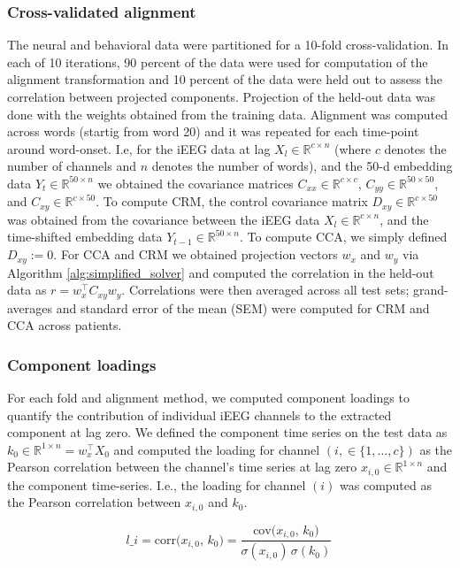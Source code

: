 \documentclass{article}
\begin{document}
\subsubsection*{Cross-validated alignment}
The neural and behavioral data were partitioned for a 10-fold cross-validation. In each of 10 iterations, 90 percent of the data were used for computation of the alignment transformation and 10 percent of the data were held out to assess the correlation between projected components. Projection of the held-out data was done with the weights obtained from the training data. Alignment was computed across words (startig from word 20) and it was repeated for each time-point around word-onset. I.e, for the iEEG data at lag $X_{l} \in \mathbb{R}^{c \times n}$ (where $c$ denotes the number of channels and $n$ denotes the number of words), and the 50-d embedding data $Y_t \in \mathbb{R}^{50 \times n}$ we obtained the covariance matrices $C_{xx} \in \mathbb{R}^{c \times c}$, $C_{yy} \in \mathbb{R}^{50 \times 50}$, and $C_{xy} \in \mathbb{R}^{c \times 50}$. To compute CRM, the control covariance matrix $D_{xy} \in \mathbb{R}^{c \times 50}$ was obtained from the covariance between the iEEG data $X_{l} \in \mathbb{R}^{c \times n}$, and the time-shifted embedding data  $Y_{t-1} \in \mathbb{R}^{50 \times n}$. To compute CCA, we simply defined $D_{xy} := 0 $. For CCA and CRM we obtained projection vectors $w_x$ and $w_y$ via Algorithm \ref{alg:simplified_solver} and computed the correlation in the held-out data as $r = w_x^\top C_{xy} w_y$. Correlations were then averaged across all test sets; grand-averages and standard error of the mean (SEM) were computed for CRM and CCA across patients.
\subsubsection*{Component loadings}
For each fold and alignment method, we computed component loadings to quantify the contribution of individual iEEG channels to the extracted component at lag zero. We defined the component time series on the test data as $k_{0} \in \mathbb{R}^{1 \times n} = w_x^\top X_{0}  $ and computed the loading for channel $(i, \in \{1,\dots,c\})$ as the Pearson correlation between the channel's time series at lag zero $x_{i,0} \in \mathbb{R}^{1 \times n}$ and the component time-series.
I.e., the loading for channel $(i)$ was computed as the Pearson correlation between $x_{i,0}$ and $k_{0}$.

\begin{equation}
    l\_i = \mathrm{corr}\bigl(x_{i,0},\,k_{0}\bigr) = \frac{\mathrm{cov}\!\bigl(x_{i,0},\,k_{0}\bigr)}{\sigma(x_{i,0})\,\sigma(k_{0})}\,
\end{equation}
\end{document}
